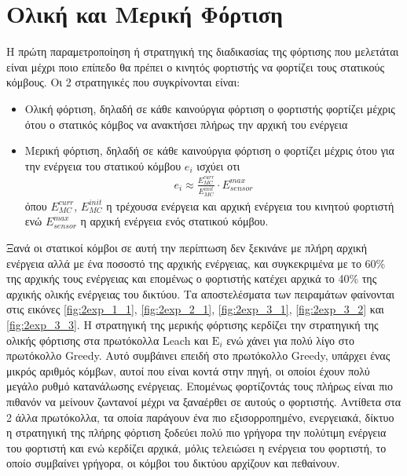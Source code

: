\section{Ολική και Μερική Φόρτιση}
Η πρώτη παραμετροποίηση ή στρατηγική της διαδικασίας της φόρτισης που μελετάται είναι μέχρι ποιο επίπεδο θα πρέπει ο
κινητός φορτιστής να φορτίζει τους στατικούς κόμβους. Οι 2 στρατηγικές που συγκρίνονται είναι:
\begin{itemize}
  \item Oλική φόρτιση, δηλαδή σε κάθε καινούργια φόρτιση ο φορτιστής φορτίζει μέχρις ότου ο στατικός κόμβος να ανακτήσει πλήρως την αρχική του ενέργεια
  \item Μερική φόρτιση, δηλαδή σε κάθε καινούργια φόρτιση ο φορτίζει μέχρις ότου για  την ενέργεια του στατικού κόμβου $e_{i}$ ισχύει οτι
\begin{align*}
e_{i} \approx \frac{E^{curr}_{MC}}{E^{init}_{MC}}\cdot E^{max}_{sensor}
\end{align*}
όπου $E^{curr}_{MC}$, $E^{init}_{MC}$ η τρέχουσα ενέργεια και αρχική ενέργεια του κινητού φορτιστή ενώ $E^{max}_{sensor}$ η αρχική ενέργεια ενός στατικού κόμβου.
\end{itemize}
Ξανά οι στατικοί κόμβοι σε αυτή την περίπτωση δεν ξεκινάνε με πλήρη αρχική ενέργεια αλλά με ένα ποσοστό της αρχικής ενέργειας, και συγκεκριμένα
με το 60\% της αρχικής τους ενέργειας και επομένως ο φορτιστής κατέχει αρχικά το 40\% της αρχικής ολικής ενέργειας του δικτύου. Τα αποστελέσματα των πειραμάτων
φαίνονται στις εικόνες \ref{fig:2exp_1_1}, \ref{fig:2exp_2_1}, \ref{fig:2exp_3_1}, \ref{fig:2exp_3_2} και \ref{fig:2exp_3_3}. Η στρατηγική της μερικής φόρτισης
κερδίζει την στρατηγική της ολικής φόρτισης στα πρωτόκολλα Leach και $\text{E}_{i}$ ενώ χάνει για πολύ λίγο στο πρωτόκολλο Greedy. Αυτό συμβάινει επειδή στο
πρωτόκολλο Greedy, υπάρχει ένας μικρός αριθμός κόμβων, αυτοί που είναι κοντά στην πηγή, οι οποίοι έχουν πολύ μεγάλο ρυθμό κατανάλωσης ενέργειας. Επομένως
φορτίζοντάς τους πλήρως είναι πιο πιθανόν να μείνουν ζωντανοί μέχρι να ξαναέρθει σε αυτούς ο φορτιστής. Αντίθετα στα 2 άλλα πρωτόκολλα, τα οποία παράγουν ένα πιο
εξισορροπημένο, ενεργειακά, δίκτυο η στρατηγική της πλήρης φόρτιση ξοδεύει πολύ πιο γρήγορα την πολύτιμη ενέργεια του φορτιστή και ενώ κερδίζει αρχικά, μόλις
τελειώσει η ενέργεια του φορτιστή, το οποίο συμβαίνει γρήγορα, οι κόμβοι του δικτύου αρχίζουν και πεθαίνουν.


